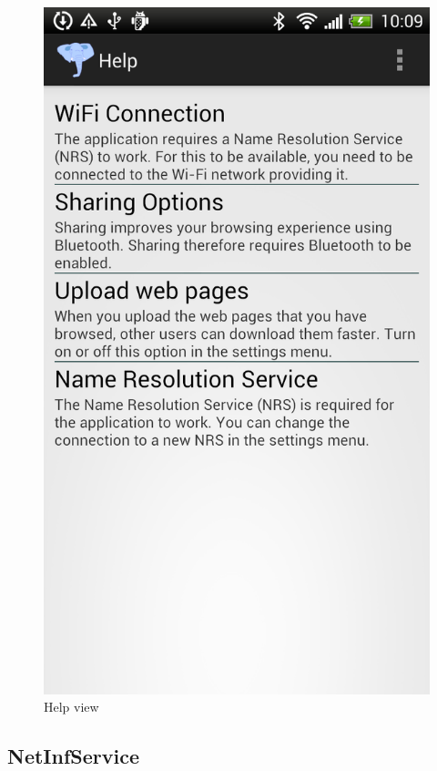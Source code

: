 \begin{figure}
\centering
\includegraphics[scale=0.29]{img/help.png}
\caption{Help view}\label{fig:help}
\end{figure}

\subsection{NetInfService}

